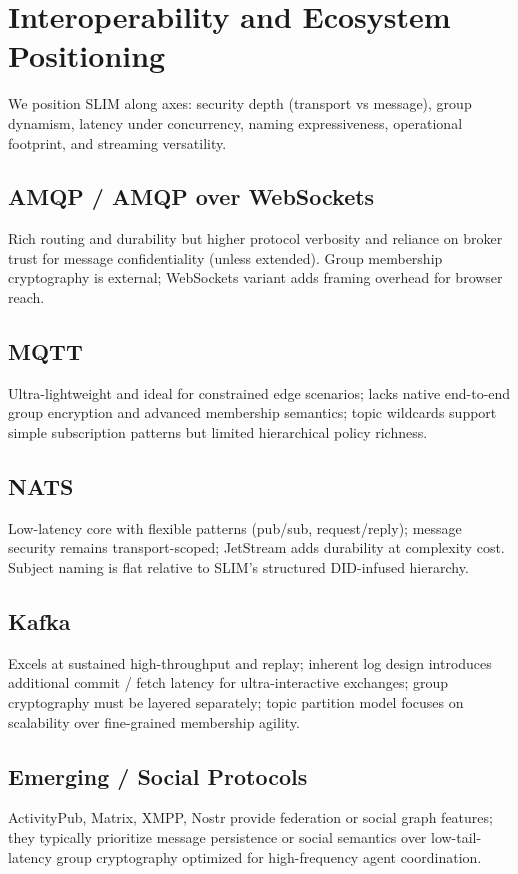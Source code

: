 \documentclass{article}
\theoremstyle{definition}
\theoremstyle{remark}
\begin{document}
\section{Interoperability and Ecosystem Positioning}\label{sec:comparison}
We position SLIM along axes: security depth (transport vs message), group dynamism, latency under concurrency, naming expressiveness, operational footprint, and streaming versatility.
\subsection{AMQP / AMQP over WebSockets}
Rich routing and durability but higher protocol verbosity and reliance on broker trust for message confidentiality (unless extended). Group membership cryptography is external; WebSockets variant adds framing overhead for browser reach.
\subsection{MQTT}
Ultra-lightweight and ideal for constrained edge scenarios; lacks native end-to-end group encryption and advanced membership semantics; topic wildcards support simple subscription patterns but limited hierarchical policy richness.
\subsection{NATS}
Low-latency core with flexible patterns (pub/sub, request/reply); message security remains transport-scoped; JetStream adds durability at complexity cost. Subject naming is flat relative to SLIM's structured DID-infused hierarchy.
\subsection{Kafka}
Excels at sustained high-throughput and replay; inherent log design introduces additional commit / fetch latency for ultra-interactive exchanges; group cryptography must be layered separately; topic partition model focuses on scalability over fine-grained membership agility.
\subsection{Emerging / Social Protocols}
ActivityPub, Matrix, XMPP, Nostr provide federation or social graph features; they typically prioritize message persistence or social semantics over low-tail-latency group cryptography optimized for high-frequency agent coordination.
\end{document}
